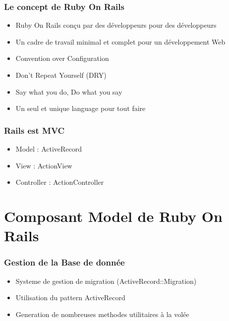 \documentclass{beamer}
\begin{document}
\begin{frame}
    \frametitle{Le concept de Ruby On Rails}
    \begin{itemize}
        \item Ruby On Rails conçu par des développeurs pour des développeurs
        \item Un cadre de travail minimal et complet pour un développement Web
        \item Convention over Configuration
        \item Don't Repeat Yourself (DRY)
        \item Say what you do, Do what you say
        \item Un seul et unique language pour tout faire
    \end{itemize}
\end{frame}

\begin{frame}
    \frametitle{Rails est MVC}
    \begin{itemize}
        \item Model : ActiveRecord
        \item View : ActionView
        \item Controller : ActionController
    \end{itemize}
\end{frame}

\section{Composant Model de Ruby On Rails}

\begin{frame}
    \frametitle{Gestion de la Base de donnée}
    \begin{itemize}
        \item Systeme de gestion de migration (ActiveRecord::Migration)
        \item Utilisation du pattern ActiveRecord
        \item Generation de nombreuses methodes utilitaires à la volée
    \end{itemize}
\end{frame}
\end{document}
